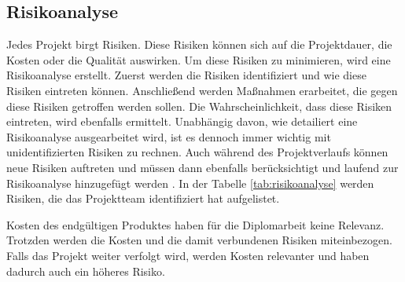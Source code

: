 \subsection{Risikoanalyse}

Jedes Projekt birgt Risiken. Diese Risiken können sich auf die Projektdauer, die Kosten oder die Qualität auswirken. Um diese Risiken zu minimieren, wird eine Risikoanalyse erstellt. Zuerst werden die Risiken identifiziert und wie diese Risiken eintreten können. Anschließend werden Maßnahmen erarbeitet, die gegen diese Risiken getroffen werden sollen. Die Wahrscheinlichkeit, dass diese Risiken eintreten, wird ebenfalls ermittelt. Unabhängig davon, wie detailiert eine Risikoanalyse ausgearbeitet wird, ist es dennoch immer wichtig mit unidentifizierten Risiken zu rechnen. Auch während des Projektverlaufs können neue Risiken auftreten und müssen dann ebenfalls berücksichtigt und laufend zur Risikoanalyse hinzugefügt werden . In der Tabelle \ref{tab:risikoanalyse} werden Risiken, die das Projektteam identifiziert hat aufgelistet.

Kosten des endgültigen Produktes haben für die Diplomarbeit keine Relevanz. Trotzden werden die Kosten und die damit verbundenen Risiken miteinbezogen. Falls das Projekt weiter verfolgt wird, werden Kosten relevanter und haben dadurch auch ein höheres Risiko.

